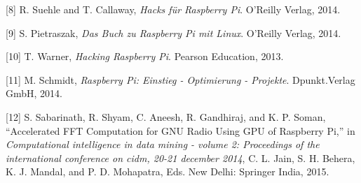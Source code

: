 \documentclass[11pt,ngerman,toc=listof,index=totoc]{scrreprt}
\begin{document}
\hypertarget{ref-suehle2014hacks}{}
{[}8{]} R. Suehle and T. Callaway, \emph{Hacks für Raspberry Pi}.
O'Reilly Verlag, 2014.

\hypertarget{ref-pietraszak2014buch}{}
{[}9{]} S. Pietraszak, \emph{Das Buch zu Raspberry Pi mit Linux}.
O'Reilly Verlag, 2014.

\hypertarget{ref-warner2013hacking}{}
{[}10{]} T. Warner, \emph{Hacking Raspberry Pi}. Pearson Education,
2013.

\hypertarget{ref-schmidt2014raspberry}{}
{[}11{]} M. Schmidt, \emph{Raspberry Pi: Einstieg - Optimierung -
Projekte}. Dpunkt.Verlag GmbH, 2014.

\hypertarget{ref-Sabarinath2015}{}
{[}12{]} S. Sabarinath, R. Shyam, C. Aneesh, R. Gandhiraj, and K. P.
Soman, ``Accelerated FFT Computation for GNU Radio Using GPU of
Raspberry Pi,'' in \emph{Computational intelligence in data mining -
volume 2: Proceedings of the international conference on cidm, 20-21
december 2014}, C. L. Jain, S. H. Behera, K. J. Mandal, and P. D.
Mohapatra, Eds. New Delhi: Springer India, 2015.
\end{document}
